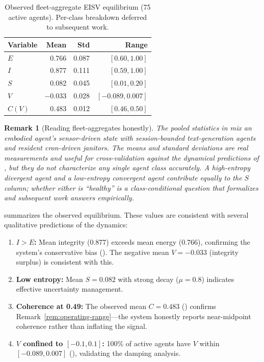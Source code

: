 \documentclass[11pt,twocolumn]{article}
\newtheorem{remark}[theorem]{Remark}
\begin{document}
\begin{table}[htbp]
\centering
\small
\caption{Observed fleet-aggregate EISV equilibrium (75 active agents). Per-class breakdown deferred to subsequent work.}
\label{tab:eisv-observed}
\begin{tabular}{@{}lrrr@{}}
\toprule
\textbf{Variable} & \textbf{Mean} & \textbf{Std} & \textbf{Range} \\
\midrule
$E$ & 0.766 & 0.087 & $[0.60, 1.00]$ \\
$I$ & 0.877 & 0.111 & $[0.59, 1.00]$ \\
$S$ & 0.082 & 0.045 & $[0.01, 0.20]$ \\
$V$ & $-0.033$ & 0.028 & $[-0.089, 0.007]$ \\
$C(V)$ & 0.483 & 0.012 & $[0.46, 0.50]$ \\
\bottomrule
\end{tabular}
\end{table}

\begin{remark}[Reading fleet-aggregates honestly]
The pooled statistics in  mix an embodied
agent's sensor-driven state with session-bounded text-generation
agents and resident cron-driven janitors. The means and standard
deviations are real measurements and useful for cross-validation
against the dynamical predictions of , but
they do not characterize any single agent class accurately. A
high-entropy divergent agent and a low-entropy convergent agent
contribute equally to the $S$ column; whether either is
``healthy'' is a class-conditional question that
 formalizes and subsequent work
answers empirically.
\end{remark}

 summarizes the observed equilibrium.
These values are consistent with several qualitative predictions
of the dynamics:
\begin{enumerate}
\item \textbf{$I > E$:} Mean integrity (0.877) exceeds mean energy
  (0.766), confirming the system's conservative bias
  (). The negative mean $V = -0.033$ (integrity
  surplus) is consistent with this.
\item \textbf{Low entropy:} Mean $S = 0.082$ with strong decay ($\mu
  = 0.8$) indicates effective uncertainty management.
\item \textbf{Coherence at 0.49:} The observed mean $C = 0.483$
  () confirms
  Remark~\ref{rem:operating-range}---the system honestly reports
  near-midpoint coherence rather than inflating the signal.
\item \textbf{$V$ confined to $[-0.1, 0.1]$:} 100\% of active agents
  have $V$ within $[-0.089, 0.007]$ (), validating
  the damping analysis.
\end{enumerate}
\end{document}
